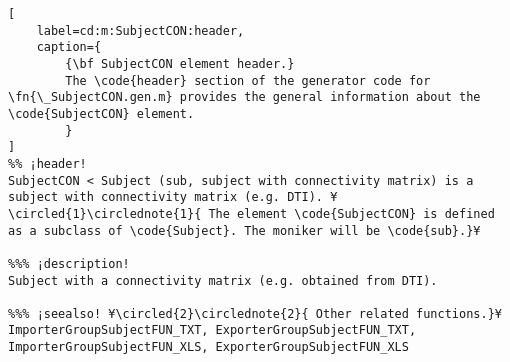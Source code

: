 \documentclass{tufte-handout}
\begin{document}
\begin{lstlisting}[
	label=cd:m:SubjectCON:header,
	caption={
		{\bf SubjectCON element header.}
		The \code{header} section of the generator code for \fn{\_SubjectCON.gen.m} provides the general information about the \code{SubjectCON} element.
		}
]
%% ¡header!
SubjectCON < Subject (sub, subject with connectivity matrix) is a subject with connectivity matrix (e.g. DTI). ¥\circled{1}\circlednote{1}{ The element \code{SubjectCON} is defined as a subclass of \code{Subject}. The moniker will be \code{sub}.}¥

%%% ¡description!
Subject with a connectivity matrix (e.g. obtained from DTI).

%%% ¡seealso! ¥\circled{2}\circlednote{2}{ Other related functions.}¥
ImporterGroupSubjectFUN_TXT, ExporterGroupSubjectFUN_TXT, ImporterGroupSubjectFUN_XLS, ExporterGroupSubjectFUN_XLS
\end{lstlisting}
\end{document}
